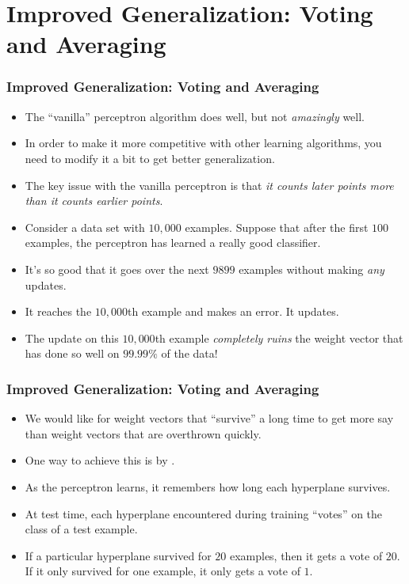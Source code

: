 \documentclass[trans]{beamer}
\begin{document}
\section{Improved Generalization: Voting and Averaging}
\begin{frame}
  \frametitle{Improved Generalization: Voting and Averaging}
\begin{itemize}
\item The
``vanilla'' perceptron algorithm does well, but not \emph{amazingly}
well.  
\item In order to make it more competitive with other learning
algorithms, you need to modify it a bit to get better generalization.
\item The key issue with the vanilla perceptron is that \emph{it counts
  later points more than it counts earlier points}.
\item Consider a data set with $10,000$ examples.  Suppose that
after the first $100$ examples, the perceptron has learned a really
good classifier. 
\item It's so good that it goes over the next $9899$
examples without making \emph{any} updates.  
\item It reaches the $10,000$th
example and makes an error.  It updates.  
\item The update
on this $10,000$th example \emph{completely ruins} the weight vector
that has done so well on $99.99\%$ of the data!
\end{itemize}
\end{frame}
\begin{frame}
  \frametitle{Improved Generalization: Voting and Averaging}
\begin{itemize}
\item 
We would like for weight vectors that ``survive'' a long time
to get more say than weight vectors that are overthrown quickly. 
\item One
way to achieve this is by . 
\item As the perceptron learns,
it remembers how long each hyperplane survives.
\item  At test time, each
hyperplane encountered during training ``votes'' on the class of a
test example. 
\item  If a particular hyperplane survived for $20$ examples,
then it gets a vote of $20$.  If it only survived for one example, it
only gets a vote of $1$.  
\end{itemize}
\end{frame}
\end{document}
